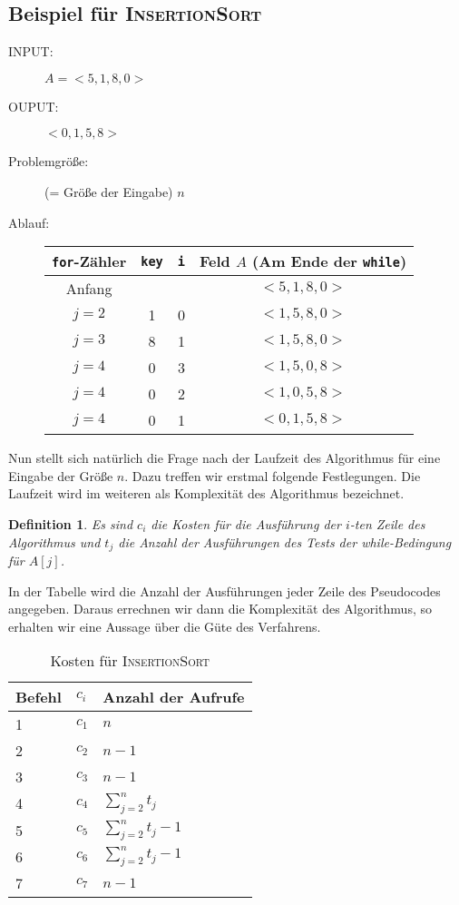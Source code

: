 \documentclass[ngerman,draft,parskip=half*,twoside]{scrreprt}
\theoremstyle{break}
\newtheorem{definition}{Definition}[chapter]
\theoremstyle{nonumberbreak}
\begin{document}
\subsection{Beispiel für \textsc{InsertionSort}}

\begin{description}
 \item[INPUT:] $A=<5,1,8,0>$
 \item[OUPUT:] $<0,1,5,8>$
 \item[Problemgröße:] (= Größe der Eingabe) $n$
 \item[Ablauf:]
  \begin{tabular}[t]{*{4}{c}}
    \texttt{for}-Zähler & \texttt{key} & \texttt{i} & Feld $A$
       {(\small Am Ende der \texttt{while})}\\
    \hline
    Anfang& & & $<5,1,8,0>$\\
    $j=2$ & 1 & 0 & $<1,5,8,0>$\\
    $j=3$ & 8 & 1 & $<1,5,8,0>$\\
    $j=4$ & 0 & 3 & $<1,5,0,8>$\\
    $j=4$ & 0 & 2 & $<1,0,5,8>$\\
    $j=4$ & 0 & 1 & $<0,1,5,8>$
  \end{tabular}
\end{description}

Nun stellt sich natürlich die Frage nach der Laufzeit des Algorithmus für eine Eingabe der Größe $n$.
Dazu treffen wir erstmal folgende Festlegungen. Die Laufzeit wird im weiteren als Komplexität des Algorithmus bezeichnet.

\begin{definition}
  Es sind $c_i$ die Kosten für die Ausführung der $i$-ten Zeile des
  Algorithmus und $t_j$ die Anzahl der Ausführungen des Tests der
  while-Bedingung für $A[j]$.
\end{definition}

In der Tabelle wird die Anzahl der Ausführungen jeder Zeile des Pseudocodes angegeben. Daraus errechnen wir dann
die Komplexität des Algorithmus, so erhalten wir eine Aussage über die Güte des Verfahrens.

\begin{table}[h]
  \begin{tabular}{*{3}{l}}
    Befehl & $c_i$ & Anzahl der Aufrufe\\
    \hline
    1 & $c_1$ & $n$\\
    2 & $c_2$ & $n-1$\\
    3 & $c_3$ & $n-1$\\
    4 & $c_4$ & $\sum_{j=2}^{n}t_j$\\
    5 & $c_5$ & $\sum_{j=2}^{n}t_j-1$\\
    6 & $c_6$ & $\sum_{j=2}^{n}t_j-1$\\
    7 & $c_7$ & $n-1$\\
  \end{tabular}
  \caption{Kosten für \textsc{InsertionSort}} 
\end{table}
\end{document}
